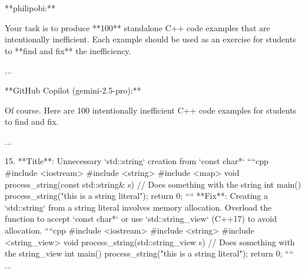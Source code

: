 \begin{markdown}
**philipobi:**  

Your task is to produce **100** standalone C++ code examples that are intentionally inefficient.  
Each example should be used as an exercise for students to **find and fix** the inefficiency.

...
\end{markdown}
\tcblower
\begin{markdown}
**GitHub Copilot (gemini-2.5-pro):**  

Of course. Here are 100 intentionally inefficient C++ code examples for students to find and fix.

...

15. **Title**: Unnecessary `std::string` creation from `const char*`
````cpp
#include <iostream>
#include <string>
#include <map>
void process_string(const std::string& s) {
    // Does something with the string
}
int main() {
    process_string("this is a string literal");
    return 0;
}
````
**Fix**: Creating a `std::string` from a string literal involves memory allocation. Overload the function to accept `const char*` or use `std::string_view` (C++17) to avoid allocation.
````cpp
#include <iostream>
#include <string>
#include <string_view>
void process_string(std::string_view s) {
    // Does something with the string_view
}
int main() {
    process_string("this is a string literal");
    return 0;
}
````
...
\end{markdown}
